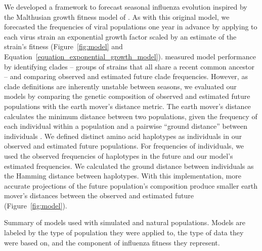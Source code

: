 We developed a framework to forecast seasonal influenza evolution inspired by the Malthusian growth fitness model of \cite{Luksza:2014hj}.
As with this original model, we forecasted the frequencies of viral populations one year in advance by applying to each virus strain an exponential growth factor scaled by an estimate of the strain's fitness (Figure~\ref{fig:model} and Equation~\ref{equation_exponential_growth_model}).
\cite{Luksza:2014hj} measured model performance by identifying clades -- groups of strains that all share a recent common ancestor -- and comparing observed and estimated future clade frequencies.
However, as clade definitions are inherently unstable between seasons, we evaluated our models by comparing the genetic composition of observed and estimated future populations with the earth mover's distance metric.
The earth mover's distance calculates the minimum distance between two populations, given the frequency of each individual within a population and a pairwise ``ground distance'' between individuals \citep{Rubner1998}.
We defined distinct amino acid haplotypes as individuals in our observed and estimated future populations.
For frequencies of individuals, we used the observed frequencies of haplotypes in the future and our model's estimated frequencies.
We calculated the ground distance between individuals as the Hamming distance between haplotypes.
With this implementation, more accurate projections of the future population's composition produce smaller earth mover's distances between the observed and estimated future (Figure~\ref{fig:model}).

\begin{table}[htb]
  \begin{center}
    \scalebox{0.7}{
      
    }
    \caption{
      Summary of models used with simulated and natural populations.
      Models are labeled by the type of population they were applied to, the type of data they were based on, and the component of influenza fitness they represent.
    }
    \label{table_model_summary}
  \end{center}
\end{table}

